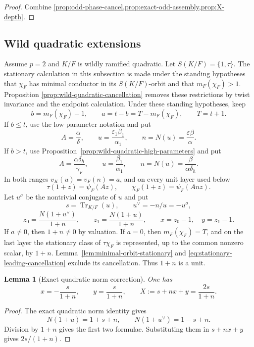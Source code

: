 \documentclass[11pt]{amsart}
\newtheorem{lemma}[theorem]{Lemma}
\theoremstyle{definition}
\theoremstyle{remark}
\newcommand{\Tr}{\operatorname{Tr}}
\newcommand{\eps}{\varepsilon}
\begin{document}
\begin{proof}
Combine \cref{prop:odd-phase-cancel,prop:exact-odd-assembly,prop:X-depth}.
\end{proof}

\subsection{Wild quadratic extensions}\label{sec:wild-quadratic}

Assume $p=2$ and $K/F$ is wildly ramified quadratic.  Let
$S(K/F)=\{1,\tau\}$.  The stationary calculation in this subsection is
made under the standing hypotheses that $\chi_F$ has minimal conductor
in its $S(K/F)$-orbit and that $m_F(\chi_F)>1$.  Proposition
\ref{prop:wild-quadratic-cancellation} removes these restrictions by
twist invariance and the endpoint calculation.  Under these standing
hypotheses, keep
\[
 b=m_F(\chi_F)-1,
 \qquad a=t-b=T-m_F(\chi_F),
 \qquad T=t+1.
\]
If $b\le t$, use the low-parameter notation and put
\[
 A=\frac{\alpha}{\delta},\qquad
 u=\frac{\eps_1\beta_1}{\alpha_1},\qquad
 n=N(u)=\frac{\eps\beta}{\alpha}.
\]
If $b>t$, use Proposition~\ref{prop:wild-quadratic-high-parameters} and put
\[
 A=\frac{\alpha\delta_h}{\gamma_F},\qquad
 u=\frac{\beta_1}{\alpha_1},\qquad
 n=N(u)=\frac{\beta}{\alpha\delta_h}.
\]
In both ranges $v_K(u)=v_F(n)=a$, and on every unit layer used below
\[
 \tau(1+z)=\psi_F(Az),\qquad
 \chi_F(1+z)=\psi_F(Anz).
\]
Let $u^\sigma$ be the nontrivial conjugate of $u$ and put
\begin{equation}\label{eq:quad-corrections}
 s=\Tr_{K/F}(u),\qquad u^\vee=-n/u=-u^\sigma,
\end{equation}
\[
 z_0=\frac{N(1+u^\vee)}{1+n},
 \qquad z_1=\frac{N(1+u)}{1+n},
 \qquad x=z_0-1,\quad y=z_1-1.
\]
If $a\ne0$, then $1+n\ne0$ by valuation.  If $a=0$, then
$m_F(\chi_F)=T$, and on the last layer the stationary class of
$\tau\chi_F$ is represented, up to the common nonzero scalar, by
$1+n$.  Lemma~\ref{lem:minimal-orbit-stationary} and
\eqref{eq:stationary-leading-cancellation} exclude its cancellation.
Thus $1+n$ is a unit.

\begin{lemma}[Exact quadratic norm correction]
\label{lem:quad-X}
One has
\begin{equation}\label{eq:quad-zxy}
 x=-\frac{s}{1+n},
 \qquad y=\frac{s}{1+n},
 \qquad
 X:=s+nx+y=\frac{2s}{1+n}.
\end{equation}
\end{lemma}

\begin{proof}
The exact quadratic norm identity gives
\[
 N(1+u)=1+s+n,
 \qquad N(1+u^\vee)=1-s+n.
\]
Division by $1+n$ gives the first two formulae.  Substituting them in
$s+nx+y$ gives $2s/(1+n)$.
\end{proof}
\end{document}
